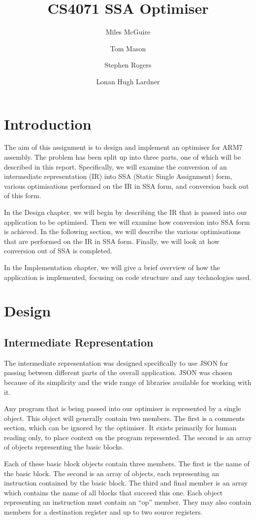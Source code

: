 \documentclass[a4paper,10pt]{report}
\title{CS4071 SSA Optimiser}
\author{
Miles McGuire\\
\and
Tom Mason\\
\and
Stephen Rogers\\
\and
Lonan Hugh Lardner
}
\begin{document}
\maketitle

\tableofcontents

\chapter{Introduction}
The aim of this assignment is to design and implement an optimiser for ARM7 assembly. The problem has been split up
into three parts, one of which will be described in this report. Specifically, we will examine the conversion of an
intermediate representation (IR) into SSA (Static Single Assignment) form, various optimisations performed on the IR 
in SSA form, and conversion back out of this form.

In the Design chapter, we will begin by describing the IR that is passed into our application to be optimised. Then we 
will examine how conversion into SSA form is achieved. In the following section, we will describe the various 
optimisations that are performed on the IR in SSA form. Finally, we will look at how conversion out of SSA is completed.

In the Implementation chapter, we will give a brief overview of how the application is implemented, focusing on code 
structure and any technologies used.

\chapter{Design}

\section{Intermediate Representation}
The intermediate representation was designed specifically to use JSON for passing between different parts of the overall 
application. JSON was chosen because of its simplicity and the wide range of libraries available for working with it.

Any program that is being passed into our optimiser is represented by a single object. This object will generally contain
two members. The first is a comments section, which can be ignored by the optimiser. It exists primarily for human reading 
only, to place context on the program represented. The second is an array of objects representing the basic blocks.

Each of these basic block objects contain three members. The first is the name of the basic block. The second is an array
of objects, each representing an instruction contained by the basic block. The third and final member is an array which
contains the name of all blocks that succeed this one. Each object representing an instruction must contain an ``op'' 
member. They may also contain members for a destination register and up to two source registers.
\end{document}
